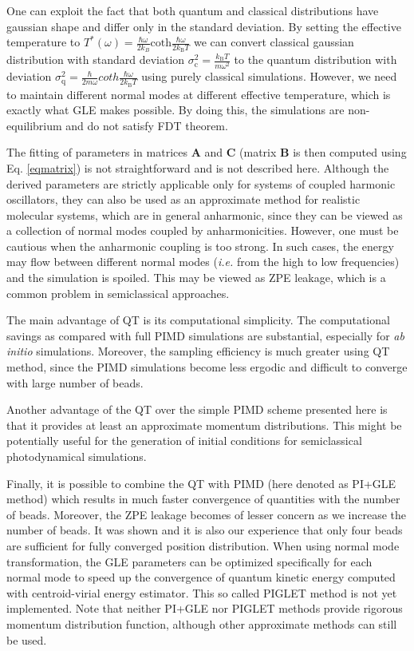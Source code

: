 One can exploit the fact that both quantum and classical distributions have gaussian shape and differ only in the standard deviation. By setting the effective temperature to $T^*(\omega)=\frac{\hbar\omega}{2k_B}\mathrm{coth}\frac{\hbar\omega}{2k_\mathrm{B}T} $ we can convert classical gaussian distribution with standard deviation $\sigma^2_\mathrm{c}=\frac{k_\mathrm{B} T}{m\omega^2}$ to the quantum distribution with deviation $\sigma^2_\mathrm{q}=\frac{\hbar}{2m\omega}coth\frac{\hbar\omega}{2k_\mathrm{B}T}$  using purely classical simulations. However, we need to maintain different normal modes at different effective temperature, which is exactly what GLE makes possible. By doing this, the simulations are non-equilibrium and do not satisfy FDT theorem.

The fitting of parameters in matrices $\mathbf{A}$ and $\mathbf{C}$ (matrix $\mathbf{B}$ is then computed using Eq. \ref{eqmatrix}) is not straightforward and is not described here. Although the derived parameters are strictly applicable only for systems of coupled harmonic oscillators, they can also be used as an approximate method for realistic molecular systems, which are in general anharmonic, since they can be viewed as a collection of normal modes coupled by anharmonicities. 
However, one must be cautious when the anharmonic coupling is too strong. In such cases, the energy may flow between different normal modes (\textit{i.e.} from the high to low frequencies) and the simulation is spoiled. This may be viewed as ZPE leakage, which is a common problem in semiclassical approaches.

The main advantage of QT is its computational simplicity. The computational savings as compared with full PIMD simulations are substantial, especially for \textit{ab initio} simulations. Moreover, the sampling efficiency is much greater using QT method, since the PIMD simulations become less ergodic and difficult to converge with large number of beads.

Another advantage of the QT over the simple PIMD scheme presented here is that it provides at least an approximate momentum distributions. This might be potentially useful for the generation of initial conditions for semiclassical photodynamical simulations.

Finally, it is possible to combine the QT with PIMD (here denoted as PI+GLE method)\cite{Ceriotti2011} which results in much faster convergence of quantities with the number of beads. Moreover, the ZPE leakage becomes of lesser concern as we increase the number of beads.
It was shown\cite{Ceriotti2011} and it is also our experience that only four beads are sufficient for fully converged position distribution. 
When using normal mode transformation, the GLE parameters can be optimized specifically for each normal mode to speed up the convergence of quantum kinetic energy computed with centroid-virial energy estimator\cite{Ceriotti2012}. This so called PIGLET method is not yet implemented. 
Note that neither PI+GLE nor PIGLET methods provide rigorous momentum distribution function, although other approximate methods can still be used\cite{Ceriotti2012}.


